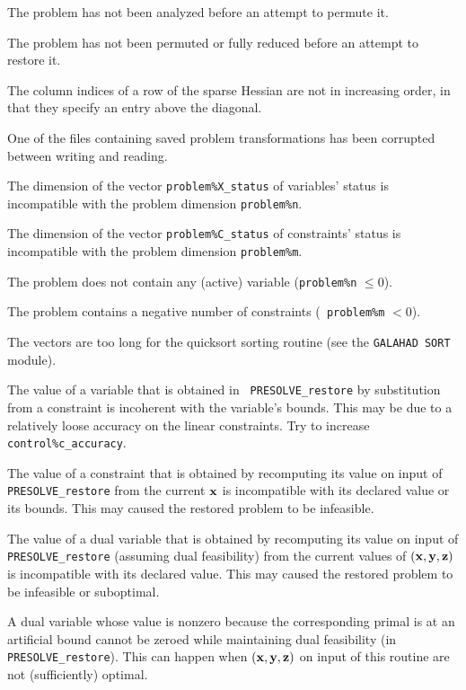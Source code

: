 \documentclass{galahad}
\newcommand{\packagename}{PRESOLVE}
\begin{document}
\begin{description}
 The problem has not been analyzed before an attempt to permute it.

 The problem has not been permuted or fully reduced
before an attempt to restore it.

 The column indices of a row of the sparse Hessian are
not in increasing order, in that they specify an entry above the diagonal.

 One of the files containing saved problem transformations has been
corrupted between  writing and reading.

 The dimension of the vector {\tt problem\%X\_status} of
variables' status is incompatible with the problem dimension {\tt problem\%n}.

 The dimension of the vector {\tt problem\%C\_status} of
constraints' status is incompatible with the problem dimension
{\tt problem\%m}.

 The problem does not contain any (active) variable ({\tt problem\%n}
$\leq 0$).

 The problem contains a negative number of constraints ({\tt
problem\%m} $< 0$).

 The vectors are too long for the quicksort sorting routine (see the
{\tt GALAHAD SORT} module).

 The value of a variable that is obtained in {\tt
\packagename\_restore} by substitution from a constraint is incoherent with
the variable's bounds.  This may be due to a relatively loose accuracy on the
linear constraints. Try to increase {\tt control\%c\_accuracy}.

 The value of a constraint that is obtained by
recomputing its value on input of {\tt \packagename\_restore} from the
current ${\mathbf{x}}$ is incompatible with its declared value
or its bounds. This may caused the restored problem to be infeasible.

 The value of a dual variable that is obtained by
recomputing its value on input of {\tt \packagename\_restore} (assuming
dual feasibility) from the current values of $( {\mathbf{x}}, {\mathbf{y}}, {\mathbf{z}} )$ is
incompatible with its declared value. This may caused the restored problem to
be infeasible or suboptimal.

 A dual variable whose value is nonzero because the
corresponding primal is at an artificial bound cannot
be zeroed while maintaining dual feasibility
(in {\tt \packagename\_restore}). This can happen when $( {\mathbf{x}}, {\mathbf{y}}, {\mathbf{z}} )$
on  input of this routine are not (sufficiently) optimal.


\end{description}
\end{document}
